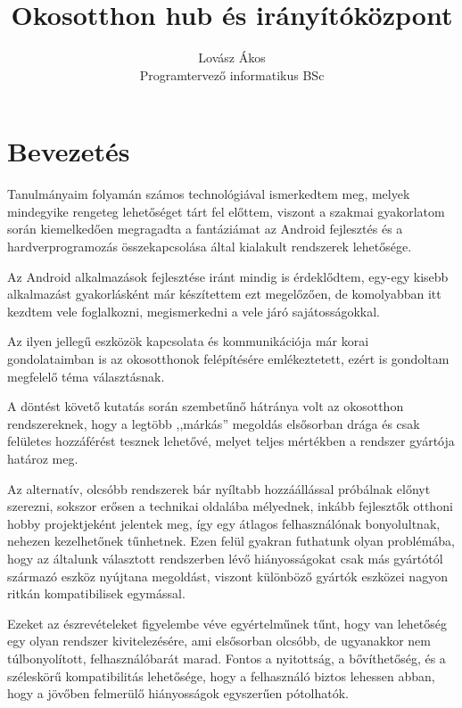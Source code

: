 \documentclass[]{thesis-ekf}
\theoremstyle{definition}
\theoremstyle{remark}
\begin{document}
\title{Okosotthon hub és irányítóközpont}
\author{Lovász Ákos\\Programtervező informatikus BSc}
\date{\the\year{}}
\maketitle
\tableofcontents

\chapter*{Bevezetés}
Tanulmányaim folyamán számos technológiával ismerkedtem meg, melyek mindegyike rengeteg
lehetőséget tárt fel előttem, viszont a szakmai gyakorlatom során kiemelkedően megragadta a fantáziámat az Android
fejlesztés és a hardverprogramozás összekapcsolása által kialakult rendszerek lehetősége.


Az Android alkalmazások fejlesztése iránt mindig is érdeklődtem, egy-egy kisebb alkalmazást gyakorlásként
már készítettem ezt megelőzően, de komolyabban itt kezdtem vele foglalkozni, megismerkedni a vele járó
sajátosságokkal.


Az ilyen jellegű eszközök kapcsolata és kommunikációja már korai gondolataimban is az okosotthonok felépítésére
emlékeztetett, ezért is gondoltam megfelelő téma választásnak.


A döntést követő kutatás során szembetűnő hátránya volt az okosotthon rendszereknek, hogy a legtöbb ,,márkás''
megoldás elsősorban drága és csak felületes hozzáférést tesznek lehetővé, melyet teljes mértékben a rendszer
gyártója határoz meg. 


Az alternatív, olcsóbb rendszerek bár nyíltabb hozzáállással próbálnak előnyt szerezni,
sokszor erősen a technikai oldalába mélyednek, inkább fejlesztők otthoni hobby projektjeként jelentek meg, 
így egy átlagos felhasználónak bonyolultnak, nehezen kezelhetőnek tűnhetnek. Ezen felül gyakran futhatunk 
olyan problémába, hogy az általunk választott rendszerben lévő hiányosságokat csak más gyártótól származó 
eszköz nyújtana megoldást, viszont különböző gyártók eszközei nagyon ritkán kompatibilisek egymással.


Ezeket az észrevételeket figyelembe véve egyértelműnek tűnt, hogy van lehetőség egy olyan rendszer kivitelezésére,
ami elsősorban olcsóbb, de ugyanakkor nem túlbonyolított, felhasználóbarát marad. Fontos a nyitottság, a bővíthetőség,
és a széleskörű kompatibilitás lehetősége, hogy a felhasználó biztos lehessen abban, hogy a jövőben felmerülő
hiányosságok egyszerűen pótolhatók.
\end{document}
